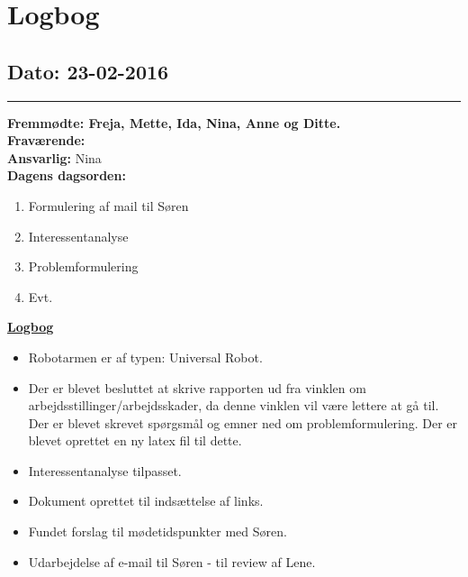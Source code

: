 \chapter{Logbog}
\section{Dato: 23-02-2016}
\hrule
\textbf{Fremmødte: Freja, Mette, Ida, Nina, Anne og Ditte.} \\
\textbf{Fraværende: } \\
\textbf{Ansvarlig:} Nina  \\
\textbf{Dagens dagsorden: }
\begin{enumerate}
	\item Formulering af mail til Søren
	\item Interessentanalyse
	\item Problemformulering
	\item Evt. 
\end{enumerate}

\underline{\textbf{Logbog}}
\begin{itemize}
	\item Robotarmen er af typen: Universal Robot.
	\item Der er blevet besluttet at skrive rapporten ud fra vinklen om arbejdsstillinger/arbejdsskader, da denne vinklen vil være lettere at gå til. Der er blevet skrevet spørgsmål og emner ned om problemformulering. Der er blevet oprettet en ny latex fil til dette. 
	\item Interessentanalyse tilpasset. 
	\item Dokument oprettet til indsættelse af links.
	\item Fundet forslag til mødetidspunkter med Søren. 
	\item Udarbejdelse af e-mail til Søren - til review af Lene.
\end{itemize}

\newpage